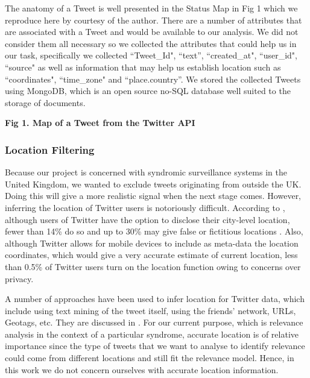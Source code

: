 \documentclass[10pt,letterpaper]{article}
\begin{document}
The anatomy of a Tweet is well presented in the Status Map in Fig 1 which we reproduce here by courtesy of the author. There are a number of attributes that are associated with a Tweet and would be available to our analysis.  We did not consider them all necessary so we collected the attributes that could help us in our task, specifically we collected  ``Tweet\_Id", ``text'', ``created\_at", ``user\_id", ``source" as well as information that may help us establish location such as ``coordinates", ``time\_zone" and ``place.country''. We stored the collected Tweets using MongoDB, which is an open source no-SQL database well suited to the storage of documents.  

\textbf{Fig 1. Map of a Tweet from the Twitter API}\\


\subsubsection{Location Filtering}
Because our project is concerned with syndromic surveillance systems in the United Kingdom, we wanted to exclude tweets originating from outside the UK. Doing this will give a more realistic signal when the next stage comes. However, inferring the location of Twitter users is notoriously difficult.  According to \cite{REF54}, although users of Twitter have the option to disclose their city-level location, fewer than 14\% do so and up to 30\% may give false or fictitious locations \cite{REF55}.  Also, although Twitter allows for mobile devices to include as meta-data the location coordinates, which would give a very accurate estimate of current location, less than 0.5\% of Twitter users turn on the location function \cite{REF54} owing to concerns over privacy.  

A number of approaches have been used to infer location for Twitter data, which include using text mining of the tweet itself, using the friends' network, URLs, Geotags, etc.  They are discussed in  \cite{REF54}.  For our current purpose, which is relevance analysis in the context of a particular syndrome, accurate location is of relative importance since the type of tweets that we want to analyse to identify relevance could come from different locations and still fit the relevance model. Hence, in this work we do not concern ourselves with accurate location information.
\end{document}
